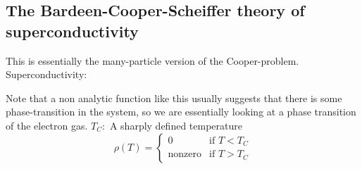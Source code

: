 \subsection[BCS-theory]{The Bardeen-Cooper-Scheiffer theory of superconductivity}

This is essentially the many-particle version of the Cooper-problem.
Superconductivity: 

Note that a non analytic function like this usually suggests that there is some phase-transition in the system, so we are essentially looking at a phase transition of the electron gas.
$T_C:$ A sharply defined temperature
\begin{equation}
\rho(T) =
\left\{
\begin{array}{ll}
	0  & \mbox{if } T<T_C \\
	\text{nonzero} & \mbox{if } T>T_C
\end{array}
\right.
\end{equation}



